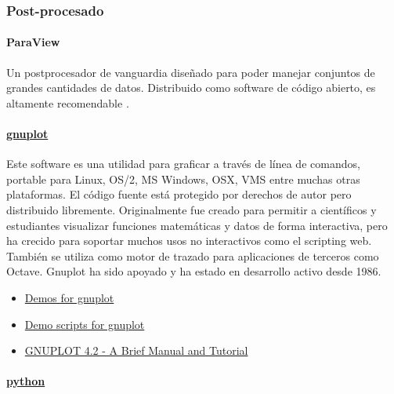 \subsubsection{Post-procesado}\label{header-n292}

\paragraph{ParaView\cite{ParaView}}\label{header-n294}

Un postprocesador de vanguardia diseñado para poder manejar conjuntos de
grandes cantidades de datos. Distribuido como software de código
abierto, es altamente recomendable\cite{kitware_blog}
\cite{kitware_blog_1} \cite{UsingParaView} \cite{cfd-online_7}
\cite{wangbo}.

\paragraph{\texorpdfstring{
\href{http://www.gnuplot.info/}{gnuplot}}{gnuplot}}\label{header-n313}

Este software es una utilidad para graficar a través de línea de
comandos, portable para Linux, OS/2, MS Windows, OSX, VMS entre muchas
otras plataformas. El código fuente está protegido por derechos de autor
pero distribuido libremente. Originalmente fue creado para permitir a
científicos y estudiantes visualizar funciones matemáticas y datos de
forma interactiva, pero ha crecido para soportar muchos usos no
interactivos como el scripting web. También se utiliza como motor de
trazado para aplicaciones de terceros como Octave. Gnuplot ha sido
apoyado y ha estado en desarrollo activo desde 1986.

\begin{itemize}
\item
  \href{http://gnuplot.sourceforge.net/demo/}{Demos for gnuplot}
\item
  \href{http://gnuplot.sourceforge.net/demo_4.2/}{Demo scripts for
  gnuplot}
\item
  \href{http://people.duke.edu/~hpgavin/gnuplot.html}{GNUPLOT 4.2 - A
  Brief Manual and Tutorial}
\end{itemize}

\paragraph{\texorpdfstring{
\href{https://openfoamwiki.net/index.php/Contrib/PyFoam}{python}}{python}}\label{header-n326}

